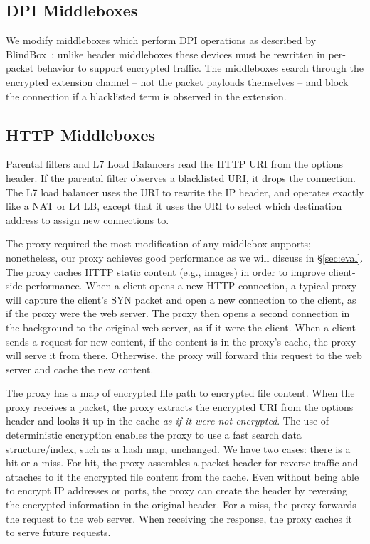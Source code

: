\subsection{DPI Middleboxes}
We modify middleboxes which perform DPI operations as described by BlindBox~\cite{blindbox}; unlike header middleboxes these devices must be rewritten in per-packet behavior to support encrypted traffic.
The middleboxes search through the encrypted extension channel -- not the packet payloads themselves -- and block the connection if a blacklisted term is observed in the extension.

\subsection{HTTP Middleboxes}
Parental filters and L7 Load Balancers read the HTTP URI from the options header. 
If the parental filter observes a blacklisted URI, it drops the connection.
The L7 load balancer uses the URI to rewrite the IP header, and operates exactly like a NAT or L4 LB, except that it uses the URI to select which destination address to assign new connections to.

The proxy required the most modification of any middlebox \sys supports; nonetheless, our proxy achieves good performance as we will discuss in \S\ref{sec:eval}.
The proxy  caches HTTP static content (e.g., images) in order to improve client-side performance. 
When a client opens a new HTTP connection, a typical proxy will capture the client's SYN packet and open a new connection to the client, as if the proxy were the web server. The proxy then opens a second connection in the background to the original web server, as if it were the client. 
When a client sends a request for new content, if the content is in the proxy's cache, the proxy will serve it from there. Otherwise, the proxy will forward this request to the web server and cache the new content. 

The proxy has a map of encrypted file path to encrypted file content. When the proxy receives a packet, the proxy extracts the encrypted URI from the options header and looks it up in the cache {\em as if it were not encrypted}. The use of deterministic encryption enables the proxy to use a fast search data structure/index, such as a hash map, unchanged. We have two cases: there is a hit or a miss. For hit, the proxy assembles a packet header for reverse traffic and attaches to it the encrypted file content from the cache. Even without being able to encrypt IP addresses or ports, the proxy can create the header by reversing the encrypted information in the original header.
For a miss, the proxy forwards the request to the web server. When receiving the response, the proxy caches it to serve future requests.



